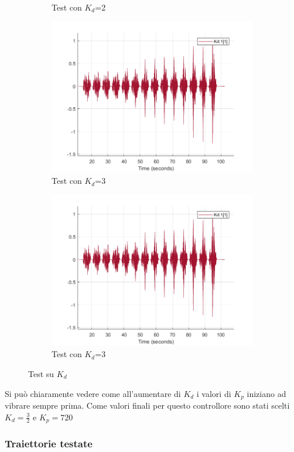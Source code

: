 \begin{figure}[!ht]
\begin{subfigure}{.5\textwidth}
  \caption{Test con $K_d$=2}
  \label{fig:sub-kd2}
\end{subfigure}
\begin{subfigure}{.5\textwidth}
  \centering
  \includegraphics[width=.8\linewidth]{Immagini/Sperimentale/Test_Kd=3.png}  
  \caption{Test con $K_d$=3}
  \label{fig:sub-kd3}
\end{subfigure}
\begin{subfigure}{.5\textwidth}
  \centering
  \includegraphics[width=.8\linewidth]{Immagini/Sperimentale/Test_Kd=3.png}  
  \caption{Test con $K_d$=3}
  \label{fig:sub-kd1}
\end{subfigure}
\caption{Test su $K_d$}
\label{fig:KdTest}
\end{figure}
Si può chiaramente vedere come all'aumentare di $K_d$ i valori di $K_p$ iniziano ad vibrare sempre prima. Come valori finali per questo controllore sono stati scelti $K_d = \frac{3}{2}$ e $K_p = 720$
\subsubsection*{Traiettorie testate}
